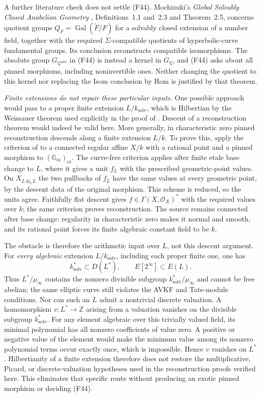 A further literature check does not settle (F44).
Mochizuki's \emph{Global Solvably Closed Anabelian Geometry}
\cite{Mochizuki2006SolvablyClosed}, Definitions~1.1 and~2.3 and
Theorem~2.5, concerns quotient groups
$Q_F=\operatorname{Gal}(\widetilde F/F)$ for a solvably closed
extension of a number field, together with the required
$\Sigma$-compatible quotients of hyperbolic-curve fundamental
groups. Its conclusion reconstructs compatible isomorphisms.
The absolute group $G_{\mathbb Q^{\mathrm{solv}}}$ in (F44)
is instead a kernel in $G_{\mathbb Q}$, and (F44) asks about
all pinned morphisms, including noninvertible ones. Neither
changing the quotient to this kernel nor replacing the Isom
conclusion by Hom is justified by that theorem.

\medskip
\noindent\emph{Finite extensions do not repair these particular inputs.}
One possible approach would pass to a proper finite extension
$L/k_{\mathrm{solv}}$, which is Hilbertian by the Weissauer theorem
used explicitly in the proof of \cite[Proposition~2.5]{F44Jarden2011}.
Descent of a reconstruction theorem would indeed be valid here.
More generally, in characteristic zero pinned reconstruction
descends along a finite extension $L/k$. To prove this, apply the
criterion of \cite[Theorem~4.18]{CHW2024} to a connected regular
affine $X/k$ with a rational point and a pinned morphism to
$(\mathbb G_m)_{\mathrm{et}}$. The curve-free criterion applies
after finite etale base change to $L$, where it gives a unit
$f_L$ with the prescribed geometric-point values. On
$X_{L\otimes_kL}$ the two pullbacks of $f_L$ have the same values
at every geometric point, by the descent data of the original
morphism. This scheme is reduced, so the units agree.
Faithfully flat descent gives $f\in\Gamma(X,\mathcal O_X)^*$
with the required values over $k$; the same criterion proves
reconstruction. The source remains connected after base change:
regularity in characteristic zero makes it normal and smooth,
and its rational point forces its finite algebraic constant field
to be $k$.

The obstacle is therefore the arithmetic input over $L$, not this
descent argument. For \emph{every algebraic} extension
$L/k_{\mathrm{solv}}$, including each proper finite one, one has
\[
 k_{\mathrm{solv}}^*\subset D(L^*),\qquad
 E[2^\infty]\subset E(L).
\]
Thus $L^*/\mu_\infty$ contains the nonzero divisible subgroup
$k_{\mathrm{solv}}^*/\mu_\infty$ and cannot be free abelian;
the same elliptic curve still violates the AVKF and Tate-module
conditions. Nor can such an $L$ admit a nontrivial discrete
valuation. A homomorphism $v:L^*\to\mathbb Z$ arising from a
valuation vanishes on the divisible subgroup $k_{\mathrm{solv}}^*$.
For any element algebraic over this trivially valued field, its
minimal polynomial has all nonzero coefficients of value zero.
A positive or negative value of the element would make the
minimum value among its nonzero polynomial terms occur exactly
once, which is impossible. Hence $v$ vanishes on $L^*$.
Hilbertianity of a finite extension therefore does not restore
the multiplicative, Picard, or discrete-valuation hypotheses used
in the reconstruction proofs verified here. This eliminates that
specific route without producing an exotic pinned morphism or
deciding (F44).


